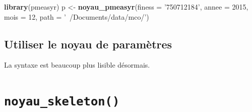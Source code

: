 \documentclass[]{book}
\newenvironment{Shaded}{\begin{snugshade}}{\end{snugshade}}
\newcommand{\CommentTok}[1]{\textcolor[rgb]{0.56,0.35,0.01}{\textit{#1}}}
\newcommand{\DataTypeTok}[1]{\textcolor[rgb]{0.13,0.29,0.53}{#1}}
\newcommand{\DecValTok}[1]{\textcolor[rgb]{0.00,0.00,0.81}{#1}}
\newcommand{\KeywordTok}[1]{\textcolor[rgb]{0.13,0.29,0.53}{\textbf{#1}}}
\newcommand{\NormalTok}[1]{#1}
\newcommand{\OperatorTok}[1]{\textcolor[rgb]{0.81,0.36,0.00}{\textbf{#1}}}
\newcommand{\StringTok}[1]{\textcolor[rgb]{0.31,0.60,0.02}{#1}}
\begin{document}
\begin{Shaded}
\begin{Highlighting}[]
\KeywordTok{library}\NormalTok{(pmeasyr)}
\NormalTok{p <-}\StringTok{ }\KeywordTok{noyau_pmeasyr}\NormalTok{(}\DataTypeTok{finess =} \StringTok{'750712184'}\NormalTok{, }
                   \DataTypeTok{annee =} \DecValTok{2015}\NormalTok{, }
                   \DataTypeTok{mois =} \DecValTok{12}\NormalTok{, }
                   \DataTypeTok{path   =} \StringTok{'~/Documents/data/mco/'}\NormalTok{)}
\end{Highlighting}
\end{Shaded}

\hypertarget{utiliser-le-noyau-de-parametres}{%
\subsection{Utiliser le noyau de paramètres}\label{utiliser-le-noyau-de-parametres}}

\begin{Shaded}
\end{Shaded}

\begin{Shaded}
\end{Shaded}

La syntaxe est beaucoup plus lisible désormais.

\hypertarget{noyau_skeleton}{%
\section{\texorpdfstring{\texttt{noyau\_skeleton()}}{noyau\_skeleton()}}\label{noyau_skeleton}}
\end{document}
